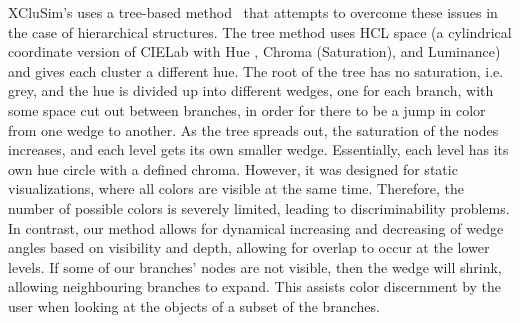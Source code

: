 \documentclass[review,journal]{vgtc}         %
\begin{document}
	XCluSim’s uses a tree-based method~\cite{tennekes2014tree} that attempts to overcome these issues in the case of hierarchical structures. 
	The tree method uses HCL space (a cylindrical coordinate version of CIELab with Hue , Chroma (Saturation), and Luminance) and gives each cluster a different hue. 
	The root of the tree has no saturation, i.e. grey, and the hue is divided up into different wedges, one for each branch, with some space cut out between branches, in order for there to be a jump in color from one wedge to another. 
	As the tree spreads out, the saturation of the nodes increases, and each level gets its own smaller wedge. 
	Essentially, each level has its own hue circle with a defined chroma. 
	However, it was designed for static visualizations, where all colors are visible at the same time. Therefore, the number of possible colors is severely limited, leading to discriminability problems.
	In contrast, our method allows for dynamical increasing and decreasing of wedge angles based on visibility and depth, allowing for overlap to occur at the lower levels. 
	If some of our branches' nodes are not visible, then the wedge will shrink, allowing neighbouring branches to expand. 
	This assists color discernment by the user when looking at the objects of a subset of the branches.
	
	
	
\end{document}

